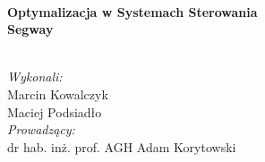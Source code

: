 \begin{titlepage}
\HRule \\[0.4cm]
{ \huge \bfseries Optymalizacja w Systemach Sterowania\\[1cm]Segway}\\[0.4cm] %
\HRule \\[3.5cm]
 






\begin{flushleft}
\Large
\emph{Wykonali:}\\
Marcin Kowalczyk\\
Maciej Podsiadło\\[1cm]

 \emph{Prowadzący:}\\
dr hab. inż. prof. AGH Adam Korytowski\\[3cm] %
 
\end{flushleft}
\end{titlepage}
\clearpage
\setcounter{page}{2}